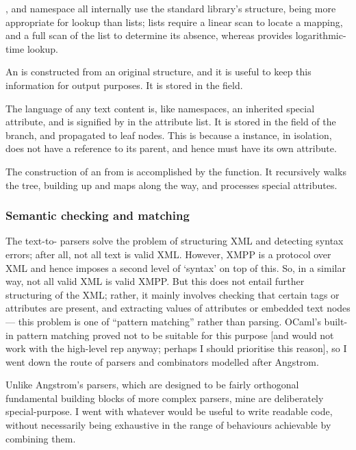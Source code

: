 ,  and namespace all internally use the standard library's  structure, being more appropriate for lookup than lists; lists require a linear scan to locate a mapping, and a full scan of the list to determine its absence, whereas  provides logarithmic-time lookup.

An  is constructed from an original  structure, and it is useful to keep this information for output purposes. It is stored in the  field.

The language of any text content is, like namespaces, an inherited special attribute, and is signified by  in the attribute list. It is stored in the  field of the branch, and propagated to leaf  nodes. This is because a  instance, in isolation, does not have a reference to its parent, and hence must have its own  attribute.

The construction of an  from  is accomplished by the  function. It recursively walks the tree, building up  and  maps along the way, and processes special attributes.

\subsubsection{Semantic checking and matching} \label{sec:matchers}
The text-to- parsers solve the problem of structuring XML and detecting syntax errors; after all, not all text is valid XML. However, XMPP is a protocol over XML and hence imposes a second level of `syntax' on top of this. So, in a similar way, not all valid XML is valid XMPP. But this does not entail further structuring of the XML; rather, it mainly involves checking that certain tags or attributes are present, and extracting values of attributes or embedded text nodes --- this problem is one of ``pattern matching'' rather than parsing. OCaml's built-in pattern matching proved not to be suitable for this purpose [and would not work with the high-level rep anyway; perhaps I should prioritise this reason], so I went down the route of parsers and combinators modelled after Angstrom.

Unlike Angstrom's parsers, which are designed to be fairly orthogonal fundamental building blocks of more complex parsers, mine are deliberately special-purpose. I went with whatever would be useful to write readable code, without necessarily being exhaustive in the range of behaviours achievable by combining them.

